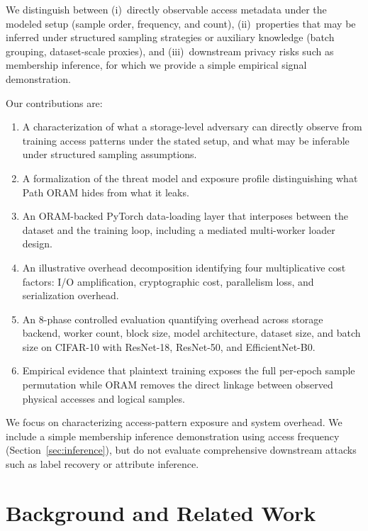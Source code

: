 \documentclass{llncs}
\begin{document}
We distinguish between (i)~directly observable access metadata under the modeled setup (sample order, frequency, and count), (ii)~properties that may be inferred under structured sampling strategies or auxiliary knowledge (batch grouping, dataset-scale proxies), and (iii)~downstream privacy risks such as membership inference, for which we provide a simple empirical signal demonstration.

Our contributions are:

\begin{enumerate}[label=(\arabic*), nosep]
    \item A characterization of what a storage-level adversary can directly observe from training access patterns under the stated setup, and what may be inferable under structured sampling assumptions.
    \item A formalization of the threat model and exposure profile distinguishing what Path ORAM hides from what it leaks.
    \item An ORAM-backed PyTorch data-loading layer that interposes between the dataset and the training loop, including a mediated multi-worker loader design.
    \item An illustrative overhead decomposition identifying four multiplicative cost factors: I/O amplification, cryptographic cost, parallelism loss, and serialization overhead.
    \item An 8-phase controlled evaluation quantifying overhead across storage backend, worker count, block size, model architecture, dataset size, and batch size on CIFAR-10 with ResNet-18, ResNet-50, and EfficientNet-B0.
    \item Empirical evidence that plaintext training exposes the full per-epoch sample permutation while ORAM removes the direct linkage between observed physical accesses and logical samples.
\end{enumerate}

We focus on characterizing access-pattern exposure and system overhead.
We include a simple membership inference demonstration using access frequency (Section~\ref{sec:inference}), but do not evaluate comprehensive downstream attacks such as label recovery or attribute inference.

\section{Background and Related Work}
\label{sec:related}
\end{document}
